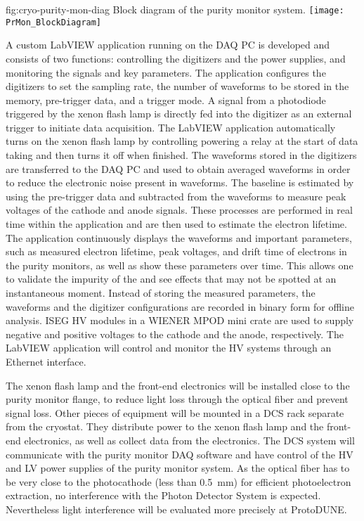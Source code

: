 \begin{dunefigure}{fig:cryo-purity-mon-diag}
  {Block diagram of the purity monitor system.}
  \texttt{[image: PrMon\_BlockDiagram]}%
\end{dunefigure}

A custom LabVIEW application running on the DAQ PC is developed and consists of two functions: controlling the digitizers and the power supplies, and monitoring the signals and key parameters. The application configures the digitizers to set the sampling rate, the number of waveforms to be stored in the memory, pre-trigger data, and a trigger mode. A signal from a photodiode triggered by the xenon flash lamp is directly fed into the digitizer as an external trigger to initiate data acquisition. The LabVIEW application automatically turns on the xenon flash lamp by controlling powering a relay at the start of data taking and then turns it off when finished. The waveforms stored in the digitizers are transferred to the DAQ PC and used to obtain averaged waveforms in order to reduce the electronic noise present in waveforms. The baseline is estimated by using the pre-trigger data and subtracted from the waveforms to measure peak voltages of the cathode and anode signals. These processes are performed in real time within the application and are then used to estimate the electron lifetime. The application continuously displays the waveforms and important parameters, such as measured electron lifetime, peak voltages, and drift time of electrons in the purity monitors, as well as show these parameters over time. This allows one to validate the impurity of the  and see effects that may not be spotted at an instantaneous moment. Instead of storing the measured parameters, the waveforms and the digitizer configurations are recorded in binary form for offline analysis. ISEG HV modules in a WIENER MPOD mini crate are used to supply negative and positive voltages to the cathode and the anode, respectively. The LabVIEW application will control and monitor the HV systems through an Ethernet interface.  

The xenon flash lamp and the front-end electronics will be installed close to the purity monitor flange, to reduce light loss through the optical fiber and prevent signal loss. Other pieces of equipment will be mounted in a DCS rack separate from the cryostat. They distribute power to the xenon flash lamp and the front-end electronics, as well as collect data from the electronics. The DCS system will communicate with the purity monitor DAQ software and have control of the HV and LV power supplies of the purity monitor system. 
As the optical fiber has to be very close to the photocathode (less than \SI{0.5}{\milli\meter}) for efficient photoelectron extraction, no interference with the Photon Detector System is expected. Nevertheless light interference will be evaluated more precisely at ProtoDUNE. 

